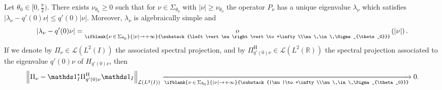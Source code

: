 \documentclass[AHL,Unicode,longabstracts,published]{cedram}
\newcommand{\abs}[1]{\left\vert #1\right\vert}
\renewcommand{\leq}{\leqslant}
\renewcommand{\geq}{\geqslant}
\newcommand{\littleo}[3][]{\mathop{o}\limits_{\ifblank{#1}{#2 \to #3}{\substack{#2\to #3\\#1}}}}
\newcommand{\1}{\mathds 1}
\newcommand{\limt}[3][]{\xrightarrow[\ifblank{#1}{#2 \to #3}{\substack{#2\to #3\\#1}}]{}}
\newcommand{\R}{\mathbb{R}}
\newcommand{\Lc}{{\mathcal L}}
\newcommand{\sector}[1][\theta_0]{\Sigma_{#1}}
\newcommand{\h}{{\mathrm{H}}}
\renewcommand{\th}{\theta}
\renewcommand{\l}{\lambda}
\begin{document}
\begin{prop}\label{prop-lambda-n}
Let $\th_0 \in [0,\frac \pi 2)$. There exists $\nu_{\theta_0} \geq 0$ such that for $\nu \in \sector$ with $\abs \nu \geq \nu_{\theta_0}$ the operator $P_\nu$ has a unique eigenvalue $\lambda_\nu$ which satisfies $\abs{\lambda_\nu - q'(0)\nu} \leq q'(0) \abs \nu$. Moreover, $\lambda_\nu$ is algebraically simple and
\[
\abs{\l_\nu - q'(0) \nu} = \littleo[\nu\,\in\,\sector]{\abs \nu} {+\infty} \left(\abs \nu \right).
\]
If we denote by $\Pi_\nu \in \Lc(L^2(I))$ the associated spectral projection, and by $\Pi^\h_{q'(0)\nu} \in \Lc(L^2(\R))$ the spectral projection associated to the eigenvalue $q'(0)\nu$ of $H_{q'(0)\nu}$, then
\[
\left\|\Pi_\nu - \1_I^* \Pi^\h_{q'(0)\nu}\1_I\right\|_{\Lc\left(L^2(I)\right)} \limt[\nu\,\in\,\sector]{|\nu|}{+\infty} 0.
\]
\end{prop}
\end{document}
